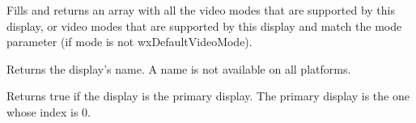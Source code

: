 Fills and returns an array with all the video modes that
are supported by this display, or video modes that are 
supported by this display and match the mode parameter
(if mode is not wxDefaultVideoMode).


\label{wxdisplaygetname}


Returns the display's name.  A name is not available on all platforms.


\label{wxdisplayisprimary}


Returns true if the display is the primary display.  The primary display is the
one whose index is 0.

